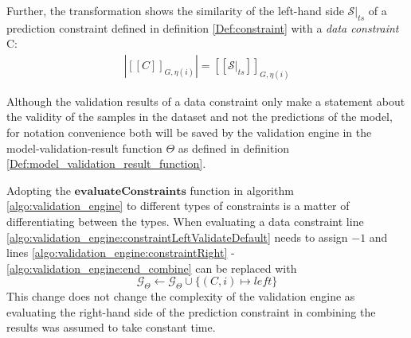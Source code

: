 Further, the transformation shows the similarity of the left-hand side $\mathcal{S}\big|_{ts}$ of a prediction constraint defined in definition \ref{Def:constraint} with a \emph{data constraint} C: 
\begin{gather}
    \left|[[C]]_{G,\eta(i)}\right| = [[\mathcal{S}\big|_{ts}]]_{G,\eta(i)} \label{data_prediction_shape_evaluation_comp}
\end{gather}

Although the validation results of a data constraint only make a statement about the validity of the samples in the dataset and not the predictions of the model, for notation convenience both will be saved by the validation engine in the model-validation-result function $\Theta$ as defined in definition \ref{Def:model_validation_result_function}.

Adopting the $\textbf{evaluateConstraints}$ function in algorithm \ref{algo:validation_engine} to different types of constraints is a matter of differentiating between the types. When evaluating a data constraint line \ref{algo:validation_engine:constraintLeftValidateDefault} needs to assign $-1$ and lines \ref{algo:validation_engine:constraintRight} - \ref{algo:validation_engine:end_combine} can be replaced with \[\mathcal{G}_\Theta \gets \mathcal{G}_\Theta \cup \{(C,i) \mapsto \textit{left}\}\] This change does not change the complexity of the validation engine as evaluating the right-hand side of the prediction constraint in combining the results was assumed to take constant time.


